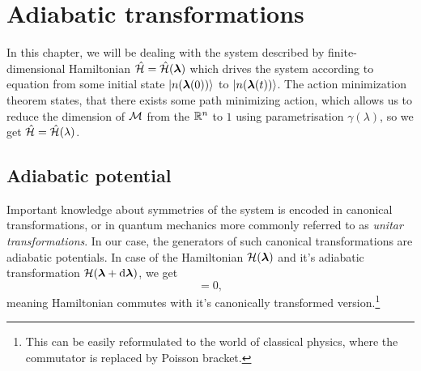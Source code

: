 \section{Adiabatic transformations}
In this chapter, we will be dealing with the system described by finite-dimensional Hamiltonian $\hat{\mathcal{H}}=\hat{\mathcal{H}}({\bm\lambda})$ which drives the system according to \Schrodinger equation from some initial state $\ket{n({\bm\lambda}(0))}$ to $\ket{n({\bm\lambda}(t))}$. The action minimization theorem states, that there exists some path minimizing action, which allows us to reduce the dimension of $\mathcal{M}$ from the $\mathbb{R}^n$ to $1$ using parametrisation $\gamma(\lambda)$, so we get $\hat{\mathcal{H}}=\hat{\mathcal{H}}(\lambda)$.

\subsection{Adiabatic potential}
Important knowledge about symmetries of the system is encoded in canonical transformations, or in quantum mechanics more commonly referred to as \emph{unitar transformations}. In our case, the generators of such canonical transformations are adiabatic potentials. In case of the Hamiltonian $\mathcal{H}({\bm\lambda})$ and it's adiabatic transformation $\mathcal{H}({\bm\lambda}+\mathrm{d} {\bm\lambda})$, we get
\begin{equation}
    [\HH(\llambda),\HH(\llambda+\d \llambda)]=0,
\end{equation}
meaning Hamiltonian commutes with it's canonically transformed version.\footnote{This can be easily reformulated to the world of classical physics, where the commutator is replaced by Poisson bracket.}


